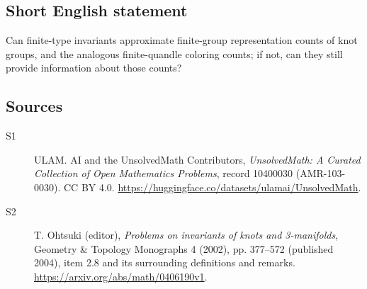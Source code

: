 \documentclass[11pt]{article}
\begin{document}
\subsection{Short English statement}
Can finite-type invariants approximate finite-group representation counts of knot groups, and the analogous finite-quandle coloring counts; if not, can they still provide information about those counts?
\subsection{Sources}
\begin{description}
\item[\hypertarget{source:10400030:1}{S1}] ULAM. AI and the UnsolvedMath Contributors, \emph{UnsolvedMath: A Curated Collection of Open Mathematics Problems}, record 10400030 (AMR-103-0030). CC BY 4.0. \url{https://huggingface.co/datasets/ulamai/UnsolvedMath}.
\item[\hypertarget{source:10400030:2}{S2}] T. Ohtsuki (editor), \emph{Problems on invariants of knots and 3-manifolds}, Geometry \& Topology Monographs 4 (2002), pp. 377--572 (published 2004), item 2.8 and its surrounding definitions and remarks. \url{https://arxiv.org/abs/math/0406190v1}.
\end{description}
\label{end:10400030}
\end{document}
